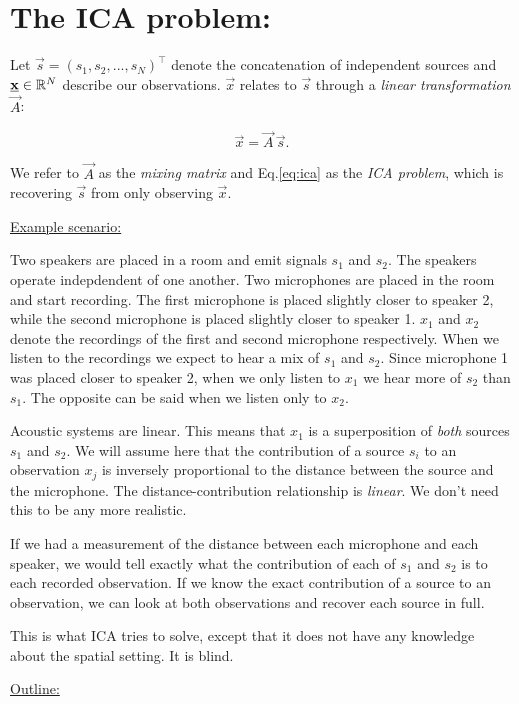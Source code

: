 
\section{The ICA problem:}

Let $\vec s = (s_1, s_2,...,s_N)^\top$ denote the concatenation of independent sources 
and $\underline{\mathbf{x}} \in \mathbb{R}^N$ describe our observations. $\vec x$ relates to $\vec s$ through a 
\emph{linear transformation} $\vec A$:

\begin{equation}
\label{eq:ica}
\vec x = \vec A \, \vec s.
\end{equation}

We refer to $\vec A$ as the \emph{mixing matrix} and Eq.\ref{eq:ica} as the \emph{ICA problem}, 
which is recovering $\vec s$ from only observing $\vec x$.

\underline{Example scenario:}

Two speakers are placed in a room and emit signals $s_1$ and $s_2$. 
The speakers operate indepdendent of one another.  
Two microphones are placed in the room and start recording. 
The first microphone is placed slightly closer to speaker 2, while 
the second microphone is placed slightly closer to speaker 1.
$x_1$ and $x_2$ denote the recordings of the first and second microphone respectively. 
When we listen to the recordings we expect to hear a mix of $s_1$ and $s_2$. 
Since microphone 1 was placed closer to speaker 2, when we only listen to $x_1$ we hear more of $s_2$ than $s_1$. 
The opposite can be said when we listen only to $x_2$.

Acoustic systems are linear. This means that $x_1$ is a superposition of \emph{both} sources $s_1$ and $s_2$. 
We will assume here that the contribution of a source $s_i$ 
to an observation $x_j$ is inversely proportional to the distance between the source and the microphone. 
The distance-contribution relationship is \emph{linear}. We don't need this to be any more realistic. 

If we had a measurement of the distance between each microphone and each speaker, 
we would tell exactly what the contribution of each of $s_1$ and $s_2$ is to each recorded observation. 
If we know the exact contribution of a source to an observation, we can look at both observations and recover each source in full.

This is what ICA tries to solve, except that it does not have any knowledge about the spatial setting. It is blind.

\underline{Outline:}

